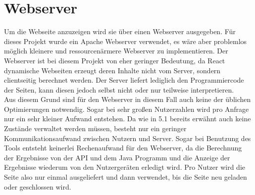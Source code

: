 \section{Webserver}
Um die Webseite anzuzeigen wird sie über einen Webserver ausgegeben. Für dieses Projekt wurde ein Apache Webserver verwendet, es wäre aber problemlos möglich kleinere und ressourcenärmere Webserver zu implementieren. Der Webserver ist bei diesem Projekt von eher geringer Bedeutung, da React dynamische Webseiten erzeugt deren Inhalte nicht vom Server, sondern clientseitig berechnet werden. Der Server liefert lediglich den Programmiercode der Seiten, kann diesen jedoch selbst nicht oder nur teilweise interpretieren. \\
Aus diesem Grund sind für den Webserver in diesem Fall auch keine der üblichen Optimierungen notwendig. Sogar bei sehr großen Nutzerzahlen wird pro Anfrage nur ein sehr kleiner Aufwand entstehen. Da wie in 5.1 bereits erwähnt auch keine Zustände verwaltet werden müssen, besteht nur ein geringer Kommunikationsaufwand zwischen Nutzern und Server. Sogar bei Benutzung des Tools entsteht keinerlei Rechenaufwand für den Webserver, da die Berechnung der Ergebnisse von der API und dem Java Programm und die Anzeige der Ergebnisse wiederum von den Nutzergeräten erledigt wird. Pro Nutzer wird die Seite also nur einmal ausgeliefert und dann verwendet, bis die Seite neu geladen oder geschlossen wird.
